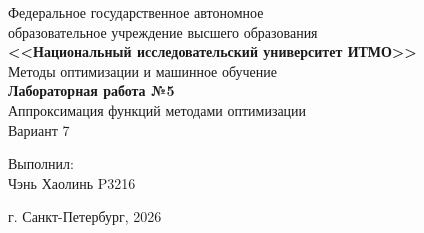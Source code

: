 \begin{titlepage}
    \centering
    Федеральное государственное автономное \\
    образовательное учреждение высшего образования \\
    \textbf{<<Национальный исследовательский университет ИТМО>>} \\

    \vfill
    Методы оптимизации и машинное обучение \\
    \vspace{0.5\baselineskip}
    \textbf{Лабораторная работа №5} \\
    \vspace{0.5\baselineskip}
    Аппроксимация функций методами оптимизации \\
    \vspace{0.5\baselineskip}
    Вариант 7 \\

    \vfill

    \flushright
    Выполнил:\\
    Чэнь Хаолинь P3216\\

    \vspace{4\baselineskip}

    \centering
    г. Санкт-Петербург, 2026

\end{titlepage}
